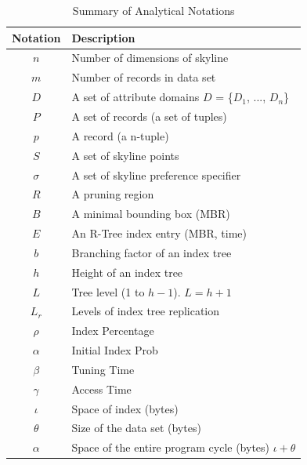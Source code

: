 \begin{table}[h]
\centering
\caption{Summary of Analytical Notations} \label{tab:index_attr}
\begin{tabular}{c|l}
\hline
{\bf Notation} & {\bf Description}\\
\hline
$n$ & Number of dimensions of skyline\\
$m$ & Number of records in data set\\
$D$ & A set of attribute domains $D$ = \{$D_1$, ..., $D_n$\}\\
$P$ & A set of records (a set of tuples)\\
$p$ & A record (a n-tuple)\\
$S$ & A set of skyline points\\
$\sigma$ & A set of skyline preference specifier\\
$R$ & A pruning region\\
$B$ & A minimal bounding box (MBR)\\
$E$ & An R-Tree index entry (MBR, time)\\
$b$ & Branching factor of an index tree\\
$h$ & Height of an index tree\\
$L$ & Tree level (1 to $h - 1$). $L = h + 1$\\
$L_r$ & Levels of index tree replication\\
$\rho$ & Index Percentage\\
$\alpha$ & Initial Index Prob\\
$\beta$ & Tuning Time\\
$\gamma$ & Access Time\\
$\iota$ & Space of index (bytes)\\
$\theta$ & Size of the data set (bytes)\\
$\alpha$ & Space of the entire program cycle (bytes) $\iota + \theta$\\
\hline
\end{tabular}
\end{table}

